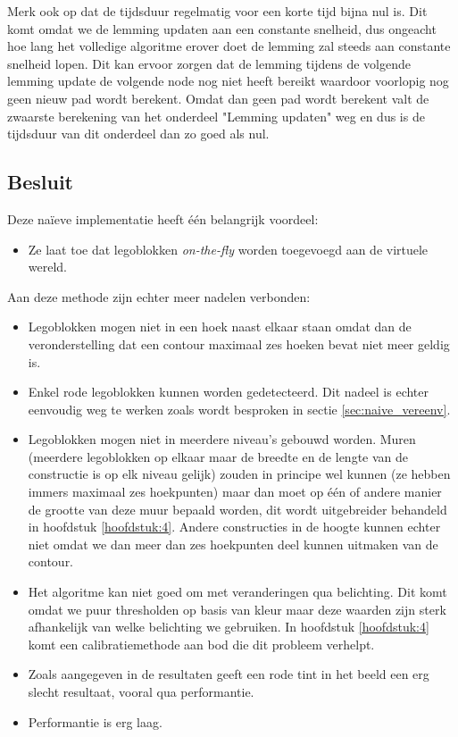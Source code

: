 Merk ook op dat de tijdsduur regelmatig voor een korte tijd bijna nul is. Dit komt omdat we de lemming updaten aan een constante snelheid, dus ongeacht hoe lang het volledige algoritme erover doet de lemming zal steeds aan constante snelheid lopen. Dit kan ervoor zorgen dat de lemming tijdens de volgende lemming update de volgende node nog niet heeft bereikt waardoor voorlopig nog geen nieuw pad wordt berekent. Omdat dan geen pad wordt berekent valt de zwaarste berekening van het onderdeel "Lemming updaten" weg en dus is de tijdsduur van dit onderdeel dan zo goed als nul.

\subsection{Besluit} \label{sec:naive_sub_besl}
Deze na\"ieve implementatie heeft \'e\'en belangrijk voordeel:
\begin{itemize}
\item Ze laat toe dat legoblokken \textit{on-the-fly} worden toegevoegd aan de virtuele wereld.
\end{itemize}

Aan deze methode zijn echter meer nadelen verbonden:
\begin{itemize}
\item Legoblokken mogen niet in een hoek naast elkaar staan omdat dan de veronderstelling dat een contour maximaal zes hoeken bevat niet meer geldig is.
\item Enkel rode legoblokken kunnen worden gedetecteerd. Dit nadeel is echter eenvoudig weg te werken zoals wordt besproken in sectie \ref{sec:naive_vereenv}.
\item Legoblokken mogen niet in meerdere niveau's gebouwd worden. Muren (meerdere legoblokken op elkaar maar de breedte en de lengte van de constructie is op elk niveau gelijk) zouden in principe wel kunnen (ze hebben immers maximaal zes hoekpunten) maar dan moet op \'e\'en of andere manier de grootte van deze muur bepaald worden, dit wordt uitgebreider behandeld in hoofdstuk \ref{hoofdstuk:4}. Andere constructies in de hoogte kunnen echter niet omdat we dan meer dan zes hoekpunten deel kunnen uitmaken van de contour.
\item Het algoritme kan niet goed om met veranderingen qua belichting. Dit komt omdat we puur thresholden op basis van kleur maar deze waarden zijn sterk afhankelijk van welke belichting we gebruiken. In hoofdstuk \ref{hoofdstuk:4} komt een calibratiemethode aan bod die dit probleem verhelpt.
\item Zoals aangegeven in de resultaten geeft een rode tint in het beeld een erg slecht resultaat, vooral qua performantie.
\item Performantie is erg laag.
\end{itemize}

